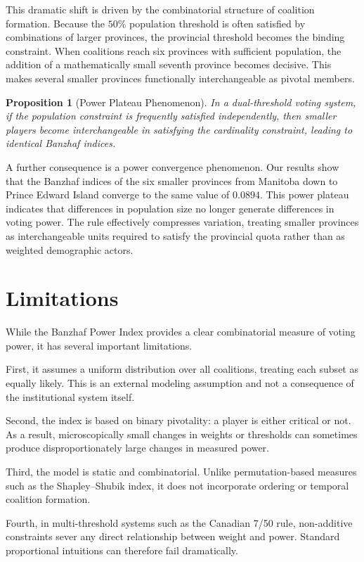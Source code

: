 \documentclass[lettersize,journal]{IEEEtran}
\newtheorem{proposition}{Proposition}
\begin{document}
This dramatic shift is driven by the combinatorial structure of coalition formation. Because the $50\%$ population threshold is often satisfied by combinations of larger provinces, the provincial threshold becomes the binding constraint. When coalitions reach six provinces with sufficient population, the addition of a mathematically small seventh province becomes decisive. This makes several smaller provinces functionally interchangeable as pivotal members.

\begin{proposition}[Power Plateau Phenomenon]
In a dual-threshold voting system, if the population constraint is frequently satisfied independently, then smaller players become interchangeable in satisfying the cardinality constraint, leading to identical Banzhaf indices.
\end{proposition}

A further consequence is a power convergence phenomenon. Our results show that the Banzhaf indices of the six smaller provinces from Manitoba down to Prince Edward Island converge to the same value of $0.0894$. This power plateau indicates that differences in population size no longer generate differences in voting power. The rule effectively compresses variation, treating smaller provinces as interchangeable units required to satisfy the provincial quota rather than as weighted demographic actors.

\section{Limitations}
While the Banzhaf Power Index provides a clear combinatorial measure of voting power, it has several important limitations.

First, it assumes a uniform distribution over all coalitions, treating each subset as equally likely. This is an external modeling assumption and not a consequence of the institutional system itself.

Second, the index is based on binary pivotality: a player is either critical or not. As a result, microscopically small changes in weights or thresholds can sometimes produce disproportionately large changes in measured power.

Third, the model is static and combinatorial. Unlike permutation-based measures such as the Shapley--Shubik index, it does not incorporate ordering or temporal coalition formation.

Fourth, in multi-threshold systems such as the Canadian 7/50 rule, non-additive constraints sever any direct relationship between weight and power. Standard proportional intuitions can therefore fail dramatically.
\end{document}
